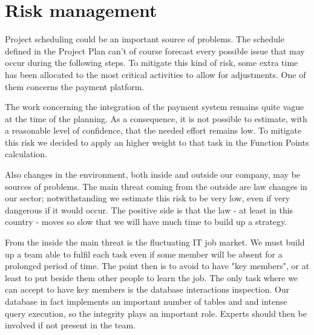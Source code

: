 \chapter{Risk management}

Project scheduling could be an important source of problems. The schedule defined in the Project Plan can't of course forecast every possible issue that may occur during the following steps. To mitigate this kind of risk, some extra time has been allocated to the most critical activities to allow for adjustments. One of them concerns the payment platform.
 
The work concerning the integration of the payment system remains quite vague at the time of the planning. As a consequence, it is not possible to estimate, with a reasonable level of confidence, that the needed effort remains low. To mitigate this risk we decided to apply an higher weight to that task in the Function Points calculation.
 
Also changes in the environment, both inside and outside our company, may be sources of problems. The main threat coming from the outside are law changes in our sector; notwithstanding we estimate this risk to be very low, even if very dangerous if it would occur. The positive side is that the law - at least in this country - moves so slow that we will have much time to build up a strategy.
 
From the inside the main threat is the fluctuating IT job market. We must build up a team able to fulfil each task even if some member will be absent for a prolonged period of time. The point then is to avoid to have "key members", or at least to put beside them other people to learn the job. The only task where we can accept to have key members is the database interactions inspection.  Our database in fact implements an important number of tables and and intense query execution, so the integrity plays an important role. Experts should then be involved if not present in the team.
